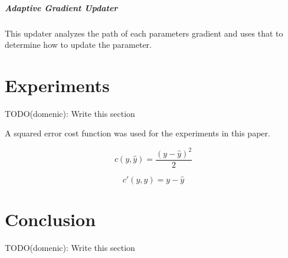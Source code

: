 \documentclass{article}
\begin{document}
\subparagraph{Adaptive Gradient Updater}

This updater analyzes the path of each parameters gradient and uses that to determine how to update the parameter.

\section{Experiments}

TODO(domenic): Write this section

A squared error cost function was used for the experiments in this paper.

\begin{equation} \label{eq:squared_cost}
c(y, \hat{y}) = \frac{(y - \hat{y})^2}{2}
\end{equation}

\begin{equation} \label{eq:squared_cost_prime}
c'(y, \hat{y}) = y - \hat{y}
\end{equation}

\section{Conclusion}

TODO(domenic): Write this section
\end{document}
